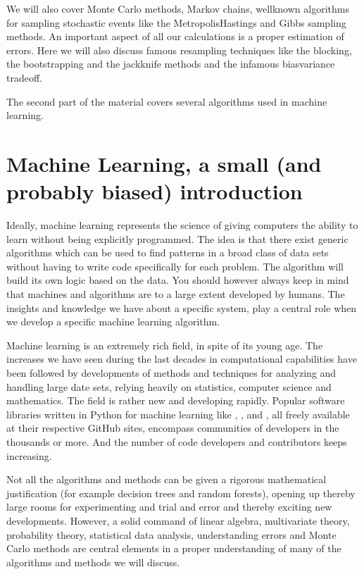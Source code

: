 \documentclass[letterpaper,10pt,english]{sphinxmanual}
\begin{document}
We will also cover Monte Carlo methods, Markov chains, well\sphinxhyphen{}known
algorithms for sampling stochastic events like the Metropolis\sphinxhyphen{}Hastings
and Gibbs sampling methods. An important aspect of all our
calculations is a proper estimation of errors. Here we will also
discuss famous resampling techniques like the blocking, the bootstrapping
and the jackknife methods and the infamous bias\sphinxhyphen{}variance tradeoff.

The second part of the material covers several algorithms used in
machine learning.


\chapter{Machine Learning, a small (and probably biased) introduction}
\label{\detokenize{chapter1:machine-learning-a-small-and-probably-biased-introduction}}
Ideally, machine learning represents the science of giving computers
the ability to learn without being explicitly programmed.  The idea is
that there exist generic algorithms which can be used to find patterns
in a broad class of data sets without having to write code
specifically for each problem. The algorithm will build its own logic
based on the data.  You should however always keep in mind that
machines and algorithms are to a large extent developed by humans. The
insights and knowledge we have about a specific system, play a central
role when we develop a specific machine learning algorithm.

Machine learning is an extremely rich field, in spite of its young
age. The increases we have seen during the last  decades in
computational capabilities have been followed by developments of
methods and techniques for analyzing and handling large date sets,
relying heavily on statistics, computer science and mathematics.  The
field is rather new and developing rapidly. Popular software libraries
written in Python for machine learning like
,
,
 and , all
freely available at their respective GitHub sites, encompass
communities of developers in the thousands or more. And the number of
code developers and contributors keeps increasing.

Not all the
algorithms and methods can be given a rigorous mathematical
justification (for example decision trees and random forests), opening up thereby large rooms for experimenting and
trial and error and thereby exciting new developments.  However, a
solid command of linear algebra, multivariate theory, probability
theory, statistical data analysis, understanding errors and Monte
Carlo methods are central elements in a proper understanding of many
of the algorithms and methods we will discuss.
\end{document}

